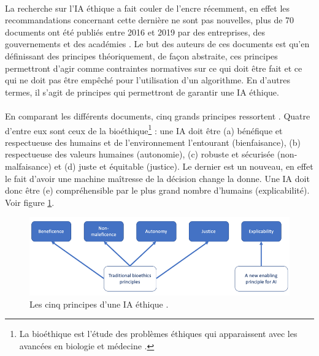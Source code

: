 \documentclass[10pt, french, a4paper]{article}
\begin{document}
\paragraph{}
La recherche sur l'IA éthique a fait couler de l'encre récemment, en effet les recommandations concernant cette dernière ne sont pas nouvelles, plus de 70 documents ont été publiés entre 2016 et 2019 par des entreprises, des gouvernements et des académies \citep{morley_what_2019}. Le but des auteurs de ces documents est qu'en définissant des principes théoriquement, de façon abstraite, ces principes permettront d'agir comme contraintes normatives \citep{turilli_ethical_2007} sur ce qui doit être fait et ce qui ne doit pas être empêché pour l'utilisation d'un algorithme. En d'autres termes, il s'agit de principes qui permettront de garantir une IA éthique.

\paragraph{}
En comparant les différents documents, cinq grands principes ressortent \cite{floridi_unified_2019}. Quatre d'entre eux sont ceux de la bioéthique\footnote{La bioéthique est l'étude des problèmes éthiques qui apparaissent avec les avancées en biologie et médecine \cite{beauchamp_principles_2009}.} : une IA doit être (a) bénéfique et respectueuse des humains et de l'environnement l'entourant (bienfaisance), (b) respectueuse des valeurs humaines (autonomie), (c) robuste et sécurisée (non-malfaisance) et (d) juste et équitable (justice). Le dernier est un nouveau, en effet le fait d'avoir une machine maîtresse de la décision change la donne. Une IA doit donc être (e) compréhensible par le plus grand nombre d'humains (explicabilité). Voir figure \ref{fig:principes_ia_ethique}.

\begin{figure}[hbt!]
    \includegraphics[width=\textwidth]{images/5_principles_ai_ethics.png}
    \caption{Les cinq principes d'une IA éthique \cite{floridi_unified_2019}.}
    \label{fig:principes_ia_ethique}
\end{figure}
\end{document}
